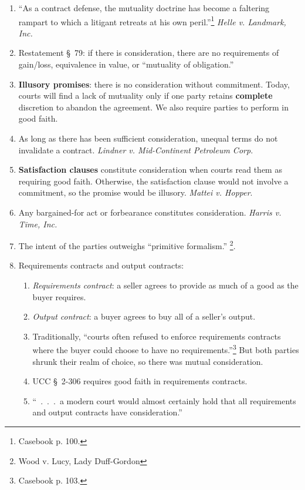 \begin{enumerate}
    \item ``As a contract defense, the mutuality doctrine has become a 
    faltering rampart to which a litigant retreats at his own 
    peril.''\footnote{Casebook p.  100.} \emph{Helle v. Landmark, Inc.}
    \item Restatement \S\ 79: if there is consideration, there are no 
    requirements of gain/loss, equivalence in value, or ``mutuality of 
    obligation.''
    \item \textbf{Illusory promises}: there is no consideration without 
    commitment. Today, courts will find a lack of mutuality only if one party 
    retains \textbf{complete} discretion to abandon the agreement. We also 
    require parties to perform in good faith.
    \item As long as there has been sufficient consideration, unequal terms do 
    not invalidate a contract. \emph{Lindner v. Mid-Continent Petroleum Corp.}
    \item \textbf{Satisfaction clauses} constitute consideration when courts 
    read them as requiring good faith. Otherwise, the satisfaction clause 
    would not involve a commitment, so the promise would be illusory. 
    \emph{Mattei v. Hopper}.
    \item Any bargained-for act or forbearance constitutes consideration. 
    \emph{Harris v. Time, Inc.}
    \item The intent of the parties outweighs ``primitive formalism.'' 
    \footnote{Wood v. Lucy, Lady Duff-Gordon}.
    \item Requirements contracts and output contracts:
    \begin{enumerate}
        \item \emph{Requirements contract}: a seller agrees to provide as much 
        of a good as the buyer requires.
        \item \emph{Output contract}: a buyer agrees to buy all of a seller's 
        output.
        \item Traditionally, ``courts often refused to enforce requirements 
        contracts where the buyer could choose to have no 
        requirements.''\footnote{Casebook p. 103.} But both parties shrunk 
        their realm of choice, so there was mutual consideration.
        \item UCC \S\ 2-306 requires good faith in requirements contracts.
        \item ``~.~.~.~a modern court would almost certainly hold that all 
        requirements and output contracts have consideration.''
    \end{enumerate}
\end{enumerate}

